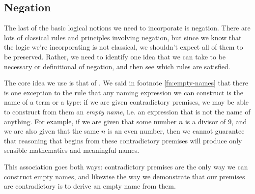 










\subsection{Negation}
\label{sec:Logic-Negation}

The last of the basic logical notions we need to incorporate is negation. There are lots of classical rules and principles involving negation, but since we know that the logic we're incorporating is not classical, we shouldn't expect all of them to be preserved.
Rather, we need to identify one idea that we can take to be necessary or definitional of negation, and then see which rules are satisfied.

The core idea we  use is that of .
We said in footnote \ref{fn:empty-names} that there is one exception to the rule that any naming expression we can construct is the name of a term or a type: if we are given contradictory premises, we may be able to construct from them an \emph{empty name}, i.e. an expression that is not the name of anything.  For example, if we are given that some number $n$ is a divisor of $9$, and we are also given that the same $n$ is an even number, then we cannot guarantee that reasoning that begins from these contradictory premises will produce only sensible mathematics and meaningful names.

This association goes both ways: contradictory premises are the only way we can construct empty names, and likewise the way we demonstrate that our premises are contradictory is to derive an empty name from them.


